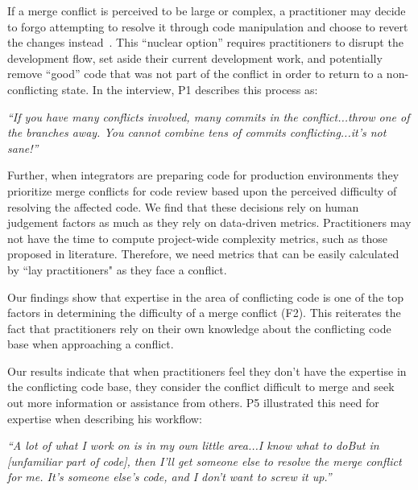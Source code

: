 If a merge conflict is perceived to be large or complex, a practitioner may decide to forgo attempting to resolve it through code manipulation and choose to revert the changes instead~\cite{Guzzi2015}.
This ``nuclear option'' requires practitioners to disrupt the development flow, set aside their current development work, and potentially remove ``good'' code that was not part of the conflict in order to return to a non-conflicting state.
In the interview, P1 describes this process as:
\begin{quoting}
\textit{``If you have many conflicts involved, many commits in the conflict...throw one of the branches away. You cannot combine tens of commits conflicting...it's not sane!''}
\end{quoting}

Further, when integrators are preparing code for production environments they prioritize merge conflicts for code review based upon the perceived difficulty of resolving the affected code.
We find that these decisions rely on human judgement factors as much as they rely on data-driven metrics.
Practitioners may not have the time to compute project-wide complexity metrics, such as those proposed in  literature. Therefore, we need metrics that can be easily calculated by ``lay practitioners" as they face a conflict. 

\label{knowledge-based-factors}
Our findings show that expertise in the area of conflicting code is one of the top factors in determining the difficulty of a merge conflict (F2). This reiterates the fact that practitioners rely on their own knowledge about the conflicting code base when approaching a conflict. 

Our results indicate that when practitioners feel they don't have the expertise in the conflicting code base, they consider the conflict difficult to merge and seek out more information or assistance from others. 
P5 illustrated this need for expertise when describing his workflow: 
\begin{quoting}
	\textit{``A lot of what I work on is in my own little area...I know what to do\textellipsis But in [unfamiliar part of code], then I'll get someone else to resolve the merge conflict for me. It's someone else's code, and I don't want to screw it up.''}
\end{quoting}




